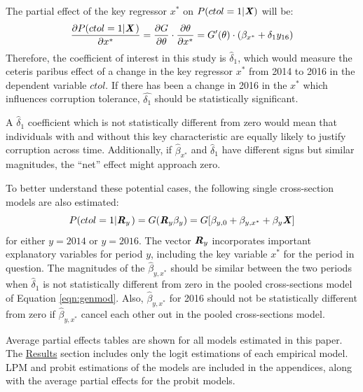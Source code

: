 \documentclass[12pt,a4]{article}\usepackage[]{graphicx}\usepackage[]{xcolor}
\begin{document}
The partial effect of the key regressor $x^*$ on $P(ctol =1| \textbf{\textit{X}})$ will be:
\begin{equation}
\label{eqn:keype}
\dfrac{\partial P(ctol = 1 | \textbf{\textit{X}} \hspace{0.04cm})}{\partial x^*} = \dfrac{\partial G}{\partial \theta} \cdot 
\dfrac{\partial \theta}{\partial x^*} = G'(\theta) \cdot (\beta_{x^*}+ \delta_1 y_{16})
\end{equation}
Therefore, the coefficient of interest in this study is $\hat{\delta}_1$, which would measure the ceteris paribus effect of a change in the key regressor $x^*$ from 2014 to 2016 in the dependent variable $ctol$. If there has been a change in 2016 in the $x^*$ which influences corruption tolerance, $\hat{\delta_1}$ should be statistically significant. 

A $\hat{\delta}_1$ coefficient which is not statistically different from zero would mean that individuals with and without this key characteristic are equally likely to justify corruption across time. Additionally, if $\hat{\beta}_{x^*}$ and $\hat{\delta}_1$ have different signs but similar magnitudes, the \enquote{net} effect might approach zero. 

To better understand these potential cases, the following single cross-section models are also estimated:
\begin{equation}
\label{eqn:crosssecmodel}
P(ctol = 1 | \textbf{\textit{R}}_y \hspace{0.04cm}) = G (\textbf{\textit{R}}_y \beta_y) = G[\beta_{y,0} + \beta_{y,x^{*}} + \beta_y \textbf{\textit{X}} ]
\end{equation}
for either $y=2014$ or $y = 2016$. The vector $\textbf{\textit{R}}_y$ incorporates important explanatory variables for period $y$, including the key variable $x^*$ for the period in question. The magnitudes of the $\hat{\beta}_{y, x^*}$ should be similar between the two periods when $\hat{\delta}_1$ is not statistically different from zero in the pooled cross-sections model of Equation \ref{eqn:genmod}. Also, $\hat{\beta}_{y,x^*}$ for 2016 should not be statistically different from zero if $\hat{\beta}_{y,x^*}$ cancel each other out in the pooled cross-sections model. 

Average partial effects tables are shown for all models estimated in this paper. The \hyperref[sec:findings]{Results} section includes only the logit estimations of each empirical model. LPM and probit estimations of the models are included in the appendices, along with the average partial effects for the probit models.
\end{document}
